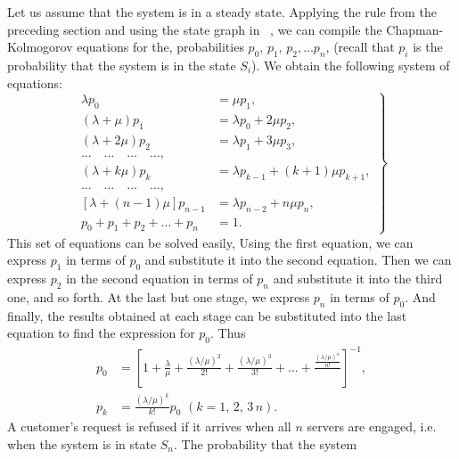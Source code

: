 Let us assume that the system is in a steady state. Applying the rule
from the preceding section and using the state graph in ~, we can compile the Chapman-Kolmogorov equations for the, probabilities $p_{0}, \, p_{1}, \, p_{2},\ldots{} p_{n}$, (recall that $p_{i}$ is the probability that the system is in the state $S_{i}$). We obtain the following system of equations:\\[-10pt]
\begin{equation}%
\left.
\begin{split}
\lambda p_{0} & = \mu p_{1},\\[-3pt]
(\lambda + \mu) p_{1} & = \lambda p_{0} + 2\mu p_{2},\\[-3pt]
(\lambda + 2 \mu) p_{2} & = \lambda p_{1} + 3\mu p_{3},\\[-3pt]
\ldots{} \quad \ldots{} \quad \ldots{} \quad \ldots{} , \\[-3pt]
(\lambda + k \mu) p_{k} & = \lambda p_{k-1} + (k+1)\mu p_{k+1},\\[-3pt]
\ldots{} \quad \ldots{} \quad \ldots{} \quad \ldots{} ,\\[-3pt]
[\lambda + (n-1) \mu] p_{n-1} & = \lambda p_{n-2} + n \mu p_{n},\\[-3pt]
p_{0} + p_{1} + p_{2} + \ldots{} + p_{n} & = 1.
\end{split}
\right\}
\label{eq-2.3}
\end{equation}
This set of equations can be solved easily, Using the first equation, we
can express $p_{1}$ in terms of $p_{0}$ and substitute it into the second equation. Then we can express $p_{2}$ in the second equation in terms of $p_{n}$ and substitute it into the third one, and so forth. At the last but one stage,
we express $p_{n}$ in terms of $p_{0}$. And finally, the results obtained at each
stage can be substituted into the last equation to find the expression for
$p_{0}$. Thus
\begin{equation}%
\begin{split}
p_{0} & =\left[ 1 + \frac{\lambda}{\mu} + \frac{(\lambda/\mu)^{2}}{2!}+ \frac{(\lambda/\mu)^{3}}{3!}+ \ldots + \frac{\frac{(\lambda/\mu)^{n}}{n!}}{} \right]^{-1},\\
p_{k} & = \frac{(\lambda/\mu)^{k}}{k!} p_{0} \,\, (k= 1,\, 2, \, 3 \, n).
\end{split}
\label{eq-2.4}
\end{equation}
A customer’s request is refused if it arrives when all $n$ servers are engaged, i.e. when the system is in state $S_{n}$. The probability that the system
